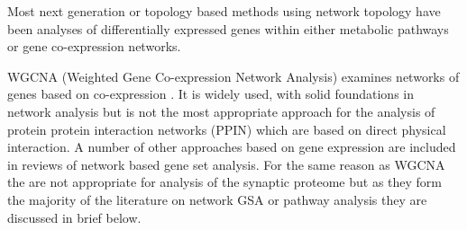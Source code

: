 Most next generation or topology based methods  using network topology have been analyses of differentially expressed genes within either metabolic pathways or gene co-expression networks.  



WGCNA (Weighted Gene Co-expression Network Analysis) examines networks of genes based on co-expression \cite{langfelder2008wgcna}. It is widely used, with solid foundations in network analysis but is not the most appropriate approach for the analysis of protein protein interaction networks (PPIN) which are based on direct physical interaction. A number of other approaches based on gene expression are included in reviews of network based gene set analysis. For the same reason as WGCNA the are not appropriate for analysis of the synaptic proteome but as they form the majority of the literature on network GSA or pathway analysis they are discussed in brief below.



